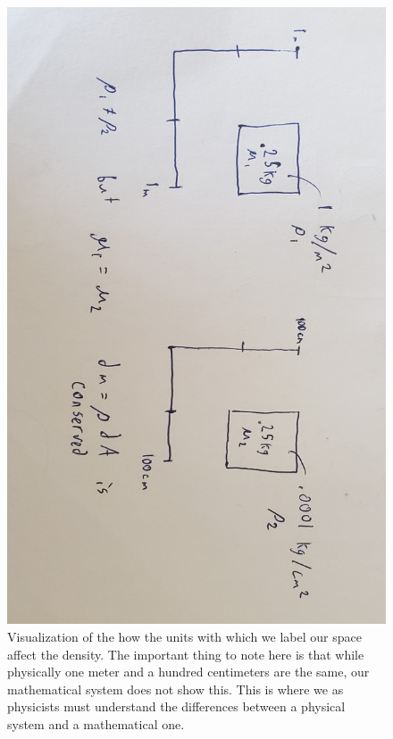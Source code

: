 \documentclass{article}
\begin{document}
\begin{figure}[!ht]
\centerline{\includegraphics[width=\textwidth,angle=90,scale=.45]{diagram5.jpg}}
\caption{Visualization of the how the units with which we label our space affect the density. The important thing to note here is that while physically one meter and a hundred centimeters are the same, our mathematical system does not show this. This is where we as physicists must understand the differences between a physical system and a mathematical one.}
\end{figure}
\end{document}
